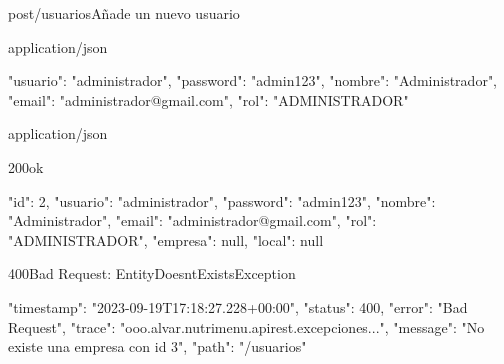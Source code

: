 \begin{apiRoute}{post}{/usuarios}{Añade un nuevo usuario}
	\begin{routeParameter}
	\end{routeParameter}
	
	\begin{routeRequest}{application/json}
		\begin{routeRequestBody}
{
    "usuario": "administrador",
    "password": "admin123",
    "nombre": "Administrador",
    "email": "administrador@gmail.com",
    "rol": "ADMINISTRADOR"
}
		\end{routeRequestBody}
	\end{routeRequest}
	\begin{routeResponse}{application/json}
		\begin{routeResponseItem}{200}{ok}
			\begin{routeResponseItemBody}
{
    "id": 2,
    "usuario": "administrador",
    "password": "admin123",
    "nombre": "Administrador",
    "email": "administrador@gmail.com",
    "rol": "ADMINISTRADOR",
    "empresa": null,
    "local": null
}
			\end{routeResponseItemBody}
		\end{routeResponseItem}
		\begin{routeResponseItem}{400}{Bad Request: EntityDoesntExistsException}
			\begin{routeResponseItemBody}
{
    "timestamp": "2023-09-19T17:18:27.228+00:00",
    "status": 400,
    "error": "Bad Request",
    "trace": "ooo.alvar.nutrimenu.apirest.excepciones...",
    "message": "No existe una empresa con id 3",
    "path": "/usuarios"
}
			\end{routeResponseItemBody}
		\end{routeResponseItem}
	\end{routeResponse}
\end{apiRoute}

